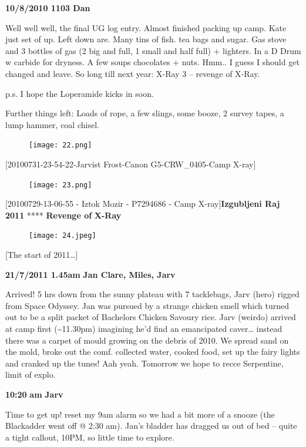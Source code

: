 \textbf{10/8/2010 1103 Dan}

Well well well, the final UG log entry. Almost finished packing up camp.
Kate just set of up. Left down are. Many tins of fish. tea bags and
sugar. Gas stove and 3 bottles of gas (2 big and full, 1 small and half
full) + lighters. In a D Drum w carbide for dryness. A few soups
chocolates + nuts. Hmm.. I guess I should get changed and leave. So long
till next year: X-Ray 3 -- revenge of X-Ray.

p.s. I hope the Loperamide kicks in soon.

Further things left: Loads of rope, a few slings, some booze, 2 survey
tapes, a lump hammer, coal chisel.

\begin{figure}[htbp]
\centering
\texttt{[image: 22.png]}
\caption{}
\end{figure}

{[}20100731-23-54-22-Jarvist Frost-Canon G5-CRW\_0405-Camp X-ray{]}

\begin{figure}[htbp]
\centering
\texttt{[image: 23.png]}
\caption{}
\end{figure}

{[}20100729-13-06-55 - Iztok Mozir - P7294686 - Camp
X-ray{]}\textbf{Izgubljeni Raj 2011} **** \textbf{Revenge of}
\textbf{X-Ray}

\begin{figure}[htbp]
\centering
\texttt{[image: 24.jpeg]}
\caption{}
\end{figure}

{[}The start of 2011\ldots{}{]}

\textbf{21/7/2011 1.45am} \textbf{Jan Clare, Miles, Jarv}

Arrived! 5 hrs down from the sunny plateau with 7 tacklebags, Jarv
(hero) rigged from Space Odyssey. Jan was pursued by a strange chicken
smell which turned out to be a split packet of Bachelors Chicken Savoury
rice. Jarv (weirdo) arrived at camp first (\textasciitilde{}11.30pm)
imagining he'd find an emancipated caver\ldots{} instead there was a
carpet of mould growing on the debris of 2010. We spread sand on the
mold, broke out the comf. collected water, cooked food, set up the fairy
lights and cranked up the tunes! Aah yeah. Tomorrow we hope to recce
Serpentine, limit of explo.

\textbf{10:20} \textbf{am} \textbf{Jarv}

Time to get up! reset my 9am alarm so we had a bit more of a snooze (the
Blackadder went off @ 2:30 am). Jan's bladder has dragged us out of bed
-- quite a tight callout, 10PM, so little time to explore.

